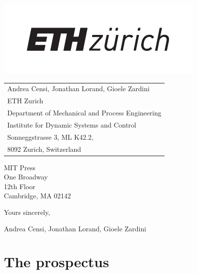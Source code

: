 \documentclass[10pt, article, one side]{memoir}
\begin{document}
    \begin{minipage}{0.45\linewidth}
        \includegraphics[width=0.9\linewidth]{pics/ethlogo.pdf}
        \vfill
    \end{minipage}
    \begin{minipage}{0.5\linewidth}
        \begin{flushright}
            \begin{tabular}{l}
                Andrea Censi, Jonathan Lorand, Gioele Zardini \\
                ETH Zurich \\
                Department of Mechanical and Process Engineering \\
                Institute for Dynamic Systems and Control \\
                Sonneggstrasse 3, ML K42.2, \\
                8092 Zurich, Switzerland
            \end{tabular}
        \end{flushright}
    \end{minipage}

    \vspace{1cm}

    \noindent MIT Press\\
    \noindent One Broadway\\
    \noindent 12th Floor \\
    \noindent Cambridge, MA 02142\\[+7pt]


    \noindent Yours sincerely,

    \noindent \hspace{10cm} Andrea Censi, Jonathan Lorand, Gioele Zardini

    \newpage

    \chapter{The prospectus}
\end{document}
